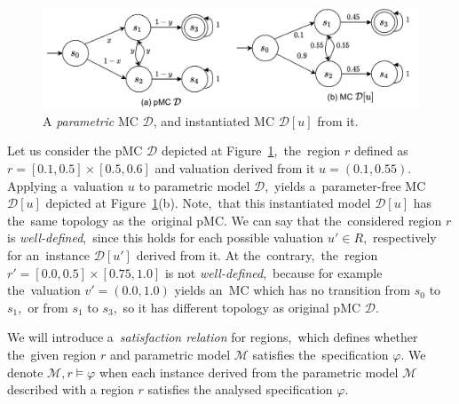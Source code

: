 \begin{figure}[h!]
\centering
\includegraphics[width=1.0\textwidth]{figures/param_instance.pdf}
\caption{A \textit{parametric} MC $\mathcal{D}$, and instantiated MC $\mathcal{D}[u]$ from it.}%
\label{fig:param_instance}%
\end{figure}

\begin{example}[Region]
Let us consider the pMC $\mathcal{D}$ depicted at Figure~\ref{fig:param_instance},~the~region $r$ defined as $r = [0.1, 0.5] \times [0.5, 0.6]$ and valuation derived from it $u = (0.1, 0.55)$.
Applying a~valuation $u$ to parametric model $\mathcal{D}$,~yields a~parameter-free MC $\mathcal{D}[u]$ depicted at Figure~\ref{fig:param_instance}(b).
Note,~that this instantiated model $\mathcal{D}[u]$ has the~same topology as the~original pMC.
We can say that the~considered region $r$ is \textit{well-defined},~since this holds for each possible valuation $u' \in R$,~respectively for an~instance $\mathcal{D}[u']$ derived from it.
At the~contrary,~the~region $r' = [0.0, 0.5] \times [0.75, 1.0]$ is not \textit{well-defined},~because for example the~valuation $v' = (0.0, 1.0)$ yields an~MC which has no transition from $s_0$ to $s_1$,~or from $s_1$ to $s_3$,~so it has different topology as original pMC $\mathcal{D}$.
\end{example}

We will introduce a~\textit{satisfaction relation} for regions,~which defines whether the~given region $r$ and parametric model $\mathcal{M}$ satisfies the~specification $\varphi$.
We denote $\mathcal{M}, r \models \varphi$ when each instance derived from the parametric model $\mathcal{M}$ described with a region $r$ satisfies the analysed specification $\varphi$.

